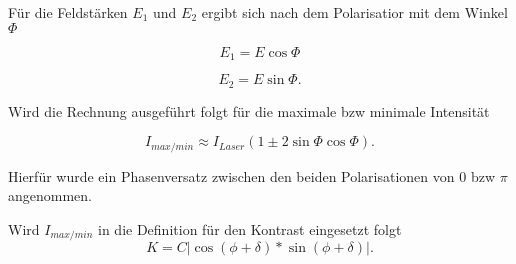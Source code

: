 Für die Feldstärken $E_1$ und $E_2$ ergibt sich nach dem Polarisatior mit dem Winkel $\Phi$

\begin{equation}
E_1 = E \cos{\Phi}
\end{equation} 

\begin{equation}
E_2 = E \sin{\Phi}.
\end{equation}

Wird die Rechnung ausgeführt folgt für die maximale bzw minimale Intensität

\begin{equation}
I_{max/min} \approx I_{Laser} \left( 1 \pm 2 \sin{\Phi} \cos{\Phi} \right).
\end{equation}

Hierfür wurde ein Phasenversatz zwischen den beiden Polarisationen von $0$ bzw $\pi$ angenommen.

Wird $I_{max/min}$ in die Definition für den Kontrast eingesetzt folgt
\begin{equation}
K = C|\cos(\phi + \delta) * \sin(\phi + \delta)|.
\end{equation}


